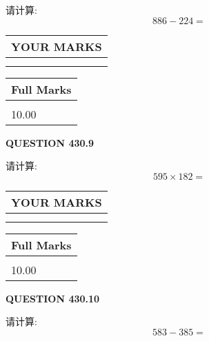 \documentclass{ctexart}
\begin{document}
  
 
请计算:
\begin{equation}
886 -   %
224 = \nonumber
\end{equation}
 

 

 
  
\vspace{0.2in}
  
\noindent\begin{tabular}{|l|}
\hline
 YOUR MARKS  \\
\hline
 \\ 
 \\ 
\hline
\end{tabular}
\hspace{0.05in} \begin{tabular}{|l|}
\hline
 Full Marks  \\
\hline
 \\ 
10.00 \\
\hline
\end{tabular}
{\textbf{\Large{QUESTION
430.9 
}}}
  
  
 
请计算:
\begin{equation}
595  \times    %
182 = \nonumber
\end{equation}
 

 

 
  
\vspace{0.2in}
  
\noindent\begin{tabular}{|l|}
\hline
 YOUR MARKS  \\
\hline
 \\ 
 \\ 
\hline
\end{tabular}
\hspace{0.05in} \begin{tabular}{|l|}
\hline
 Full Marks  \\
\hline
 \\ 
10.00 \\
\hline
\end{tabular}
{\textbf{\Large{QUESTION
430.10 
}}}
  
  
 
请计算:
\begin{equation}
583 -   %
385 = \nonumber
\end{equation}
 

 

 
   
\end{document}
